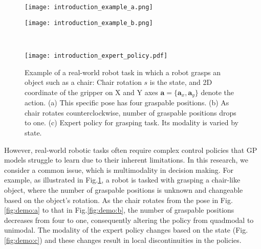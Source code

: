 \documentclass[sn-mathphys-num]{sn-jnl}
\begin{document}
\begin{figure}[!t]
    \centering
    \begin{minipage}[b]{0.4\hsize}
        \centering
        \texttt{[image: introduction\_example\_a.png]}
        \subcaption{}
        \label{fig:demo:a}
    \end{minipage}
    \begin{minipage}[b]{0.4\hsize}
        \centering
        \texttt{[image: introduction\_example\_b.png]}
        \subcaption{}
        \label{fig:demo:b}
    \end{minipage} \\ %
    \begin{minipage}[b]{0.8\hsize}
        \centering
        \texttt{[image: introduction\_expert\_policy.pdf]}
        \subcaption{}
        \label{fig:demo:c}
    \end{minipage}
    \caption{Example of a real-world robot task in which a robot grasps an object such as a chair: Chair rotation $s$ is the state, and 2D coordinate of the gripper on X and Y axes $\mathbf{a}=\{\mathbf{a}_x, \mathbf{a}_y\}$ denote the action. (a) This specific pose has four graspable positions. (b) As chair rotates counterclockwise, number of graspable positions drops to one. (c) Expert policy for grasping task. Its modality is varied by state.}
    \label{fig:demo}
\end{figure}


However, real-world robotic tasks often require complex control policies that GP models struggle to learn due to their inherent limitations. In this research, we consider a common issue, which is multimodality in decision making. For example, as illustrated in Fig.\ref{fig:demo}, a robot is tasked with grasping a chair-like object, where the number of graspable positions is unknown and changeable based on the object's rotation. As the chair rotates from the pose in Fig.\ref{fig:demo:a} to that in Fig.\ref{fig:demo:b}, the number of graspable positions decreases from four to one, consequently altering the policy from quadmodal to unimodal. The modality of the expert policy changes based on the state (Fig.\ref{fig:demo:c}) and these changes result in local discontinuities in the policies.
\end{document}
